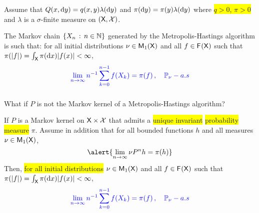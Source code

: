 \documentclass[usenames,dvipsnames]{beamer}
\newcommand\mycoltwo[1]{{\color{blue}#1}}
\newcommand\colbox[1]{\colorbox{Yellow}{#1}}
\begin{document}
  \begin{frame}
    Assume that \alert{$Q(x,\mathrm{d} y)=q(x,y)\lambda(\mathrm{d} y)$} and \alert{$\pi(\mathrm{d} y)=\pi(y)\lambda(\mathrm{d} y)$}
    where \colbox{$q>0$, $\pi>0$} and $\lambda$ is a $\sigma$-finite measure
    on $(\mathsf{X},\mathcal{X})$.
  \begin{theorem} \label{thm:lln:hm}
    The Markov chain $\left\{ X_{n}\,:\,n\in\mathbb{N}\right\}$ generated
    by the Metropolis-Hastings algorithm is such that: \alert{for all initial
    distributions $\nu\in\mathsf{M}_{1}(\mathsf{X})$} and all $f\in\mathsf{F_{}}(\mathsf{X})$
    such that $\pi(|f|)=\int_{\mathsf{X}}\pi(\mathrm{d} x)|f(x)|<\infty$,
    \begin{equation}
    \mycoltwo{\lim_{n\to\infty}n^{-1}\sum_{k=0}^{n-1}f(X_{k})=\pi(f)\,,\quad\PP_{\nu}-a.s\label{eq:LLN:MH}}
    \end{equation}
    \end{theorem}
  
\end{frame}
\begin{frame}
  \frametitle{}
  What if $P$ is not the Markov kernel of a Metropolis-Hastings algorithm? 
  \begin{theorem}
    If $P$ is a Markov kernel on $\mathsf{X} \times\mathcal{X}$ that admits a \colbox{unique invariant} \colbox{probability measure} $\pi$. Assume in addition that for all bounded functions $h$ and all measures $\nu\in\mathsf{M}_{1}(\mathsf{X})$,
    \begin{equation}
    \label{eq:setwise}
    \alert{\lim_{n \to \infty}  \nu P^n h=\pi(h)}
    \end{equation}
    \pause 
    Then, \colbox{for all initial
    distributions} $\nu\in\mathsf{M}_{1}(\mathsf{X})$ and all $f\in\mathsf{F_{}}(\mathsf{X})$
    such that $\pi(|f|)=\int_{\mathsf{X}}\pi(\mathrm{d} x)|f(x)|<\infty$,
    \begin{equation}
    \mycoltwo{\lim_{n\to\infty}n^{-1}\sum_{k=0}^{n-1}f(X_{k})=\pi(f)\,,\quad\PP_{\nu}-a.s\label{eq:LLN:gener}}
    \end{equation}
    \end{theorem}
    
  

\end{frame}
\end{document}
